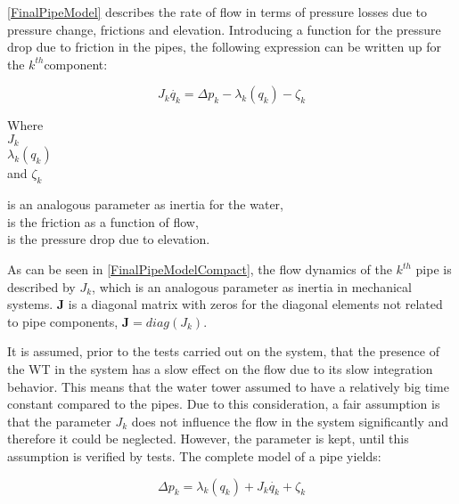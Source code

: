 \eqref{FinalPipeModel} describes the rate of flow in terms of pressure losses due to pressure change, frictions and elevation. Introducing a function for the pressure drop due to friction in the pipes, the following expression can be written up for the $k^{th}$component:

\begin{equation}
\label{FinalPipeModelCompact}
   J_k \dot{q_k} = \Delta p_k - \lambda_k(q_k) - \zeta_k 
\end{equation}

 \begin{minipage}[t]{0.20\textwidth}
Where\\
\hspace*{8mm} $J_k$ \\
\hspace*{8mm} $\lambda_k(q_k)$ \\
and \hspace*{0.7mm} $\zeta_k$ 
\end{minipage}
\begin{minipage}[t]{0.68\textwidth}
\vspace*{2mm}
is an analogous parameter as inertia for the water,\\ 
is the friction as a function of flow,\\
is the pressure drop due to elevation.
\end{minipage}

As can be seen in \eqref{FinalPipeModelCompact}, the flow dynamics of the $k^{th}$ pipe is described by $J_k$, which is an analogous parameter as inertia in mechanical systems. $\bm{J}$ is a diagonal matrix with zeros for the diagonal elements not related to pipe components, $\pmb{J} = diag(J_k)$.

It is assumed, prior to the tests carried out on the system, that the presence of the WT in the system has a slow effect on the flow due to its slow integration behavior. This means that the water tower assumed to have a relatively big time constant compared to the pipes. Due to this consideration, a fair assumption is that the parameter $J_k$ does not influence the flow in the system significantly and therefore it could be neglected. However, the parameter is kept, until this assumption is verified by tests. The complete model of a pipe yields: 
  
\begin{equation}
\label{FinalPipeModelSimplified}
  \Delta p_k  =   \lambda_k(q_k) + J_k \dot{q_k} + \zeta_k 
\end{equation}


